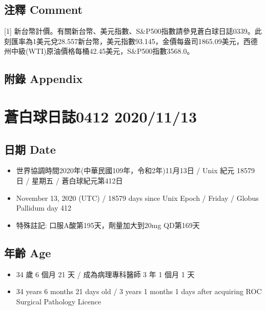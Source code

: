 \documentclass[
]{article}
\providecommand{\tightlist}{%
  \setlength{\itemsep}{0pt}\setlength{\parskip}{0pt}}
\begin{document}
\hypertarget{ux6ce8ux91cb-comment-8}{%
\subsection{注釋 Comment}\label{ux6ce8ux91cb-comment-8}}

{[}1{]}
新台幣計價。有關新台幣、美元指數、S\&P500指數請參見蒼白球日誌0339。此刻匯率為1美元兌28.557新台幣，美元指數93.145，金價每盎司1865.09美元，西德州中級(WTI)原油價格每桶42.45美元，S\&P500指數3568.0。

\hypertarget{ux9644ux9304-appendix-8}{%
\subsection{附錄 Appendix}\label{ux9644ux9304-appendix-8}}

\hypertarget{ux84bcux767dux7403ux65e5ux8a8c0412-20201113}{%
\section{蒼白球日誌0412
2020/11/13}\label{ux84bcux767dux7403ux65e5ux8a8c0412-20201113}}

\hypertarget{ux65e5ux671f-date-9}{%
\subsection{日期 Date}\label{ux65e5ux671f-date-9}}

\begin{itemize}
\tightlist
\item
  世界協調時間2020年(中華民國109年，令和2年)11月13日 / Unix 紀元 18579
  日 / 星期五 / 蒼白球紀元第412日
\item
  November 13, 2020 (UTC) / 18579 days since Unix Epoch / Friday /
  Globus Pallidum day 412
\item
  特殊註記: 口服A酸第195天，劑量加大到20mg QD第169天
\end{itemize}

\hypertarget{ux5e74ux9f61-age-9}{%
\subsection{年齡 Age}\label{ux5e74ux9f61-age-9}}

\begin{itemize}
\tightlist
\item
  34 歲 6 個月 21 天 / 成為病理專科醫師 3 年 1 個月 1 天
\item
  34 years 6 months 21 days old / 3 years 1 months 1 days after
  acquiring ROC Surgical Pathology Licence
\end{itemize}
\end{document}
